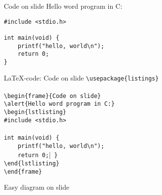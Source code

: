 \begin{frame}[fragile]{Code on slide}
\alert{Hello word program in C:}
\begin{lstlisting}
#include <stdio.h>
 
int main(void) {
    printf("hello, world\n");
    return 0;
}
\end{lstlisting}
\end{frame}

\toggleslidecolors
\begin{frame}[fragile]{\LaTeX-code: Code on slide}
\footnotesize
\verb|\usepackage{listings}|\\
\verb||\\
\verb|\begin{frame}{Code on slide}|\\
\verb|\alert{Hello word program in C:}|\\
\verb|\begin{lstlisting}|\\
\verb|#include <stdio.h>|\\
\verb||\\
\verb|int main(void) {|\\
\verb|    printf("hello, world\n");|\\
\verb|    return 0;||\
\verb|}|\\
\verb|\end{lstlisting}|\\
\verb|\end{frame}|\\
\end{frame}
\toggleslidecolors


\begin{frame}{Easy diagram on slide}
\vfill %
\begin{center}
\end{center}
\end{frame}

